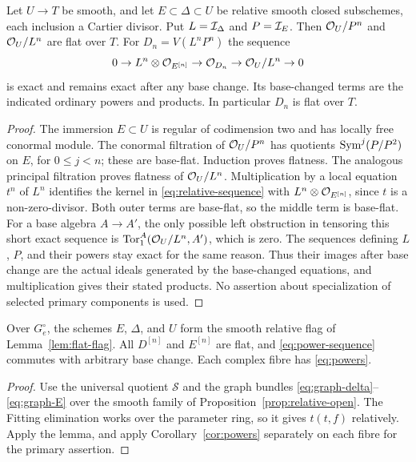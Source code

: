 \begin{lemma}\label{lem:flat-flag}
Let $U\to T$ be smooth, and let $E\subset\Delta\subset U$ be
relative smooth closed subschemes, each inclusion a Cartier divisor.
Put $L=\mathcal I_\Delta$ and $P=\mathcal I_E$. Then $\mathcal O_U/P^n$ and
$\mathcal O_U/L^n$ are flat over $T$. For $D_n=V(L^nP^n)$ the sequence
\begin{equation}\label{eq:relative-sequence}
 0\to L^n\otimes\mathcal O_{E^{[n]}}\to\mathcal O_{D_n}
        \to\mathcal O_U/L^n\to0
\end{equation}
is exact and remains exact after any base change. Its base-changed
terms are the indicated ordinary powers and products. In particular
$D_n$ is flat over $T$.
\end{lemma}
\begin{proof}
The immersion $E\subset U$ is regular of codimension two and has
locally free conormal module. The conormal filtration of $\mathcal O_U/P^n$
has quotients $\operatorname{Sym}^j(P/P^2)$ on $E$, for $0\le j<n$; these are
base-flat. Induction proves flatness. The analogous principal filtration
proves flatness of $\mathcal O_U/L^n$. Multiplication by a local equation
$t^n$ of $L^n$ identifies the kernel in \eqref{eq:relative-sequence}
with $L^n\otimes\mathcal O_{E^{[n]}}$, since $t$ is a non-zero-divisor.
Both outer terms are base-flat, so the middle term is base-flat.
For a base algebra $A\to A'$, the only possible left obstruction
in tensoring this short exact sequence is
$\operatorname{Tor}_1^A(\mathcal O_U/L^n,A')$, which is zero. The sequences defining
$L$, $P$, and their powers stay exact for the same reason. Thus their
images after base change are the actual ideals generated by the
base-changed equations, and multiplication gives their stated products.
No assertion about specialization of selected primary components is
used.
\end{proof}

\begin{corollary}\label{cor:relative-flat}
Over $G_e^\circ$, the schemes $E$, $\Delta$, and $U$ form the smooth
relative flag of Lemma~\ref{lem:flat-flag}. All $D^{[n]}$ and
$E^{[n]}$ are flat, and \eqref{eq:power-sequence} commutes with
arbitrary base change. Each complex fibre has \eqref{eq:powers}.
\end{corollary}
\begin{proof}
Use the universal quotient $\mathcal S$ and the graph bundles
\eqref{eq:graph-delta}--\eqref{eq:graph-E} over the smooth family of
Proposition~\ref{prop:relative-open}. The Fitting elimination works
over the parameter ring, so it gives $t(t,f)$ relatively. Apply the
lemma, and apply Corollary~\ref{cor:powers} separately on each fibre
for the primary assertion.
\end{proof}
